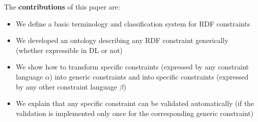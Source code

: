 \documentclass{llncs}
\newcommand{\ms}[1]{\texttt{#1}}
\begin{document}
The \textbf{contributions} of this paper are:
\begin{itemize}
	\item We define a basic terminology and classification system for RDF constraints
	\item We developed an ontology describing any RDF constraint generically (whether expressible in DL or not)%
	\item We show how to transform specific constraints (expressed by any constraint language \ms{$\alpha$}) into generic constraints and into specific constraints (expressed by any other constraint language \ms{$\beta$})
  \item We explain that any specific constraint can be validated automatically (if the validation is implemented only once for the corresponding generic constraint)
\end{itemize}

\end{document}
